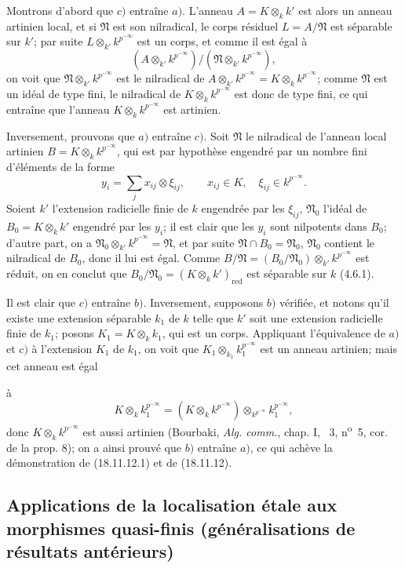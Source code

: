 Montrons d'abord que $c)$ entraîne $a)$. L'anneau $A=K\otimes_k k'$ est alors un anneau artinien local, et si $\mathfrak N$ est son nilradical, le corps résiduel $L=A/\mathfrak N$ est séparable sur $k'$; par suite $L\otimes_{k'}k^{p^{-\infty}}$ est un corps, et comme il est égal à
\[
  (A\otimes_{k'}k^{p^{-\infty}})/(\mathfrak N\otimes_{k'}k^{p^{-\infty}}),
\]
on voit que $\mathfrak N\otimes_{k'}k^{p^{-\infty}}$ est le nilradical de $A\otimes_{k'}k^{p^{-\infty}}=K\otimes_k k^{p^{-\infty}}$; comme $\mathfrak N$ est un idéal de type fini, le nilradical de $K\otimes_k k^{p^{-\infty}}$ est donc de type fini, ce qui entraîne que l'anneau $K\otimes_k k^{p^{-\infty}}$ est artinien.

Inversement, prouvons que $a)$ entraîne $c)$. Soit $\mathfrak N$ le nilradical de l'anneau local artinien $B=K\otimes_k k^{p^{-\infty}}$, qui est par hypothèse engendré par un nombre fini d'éléments de la forme
\[
  y_i=\sum_j x_{ij}\otimes\xi_{ij},\qquad x_{ij}\in K,\quad \xi_{ij}\in k^{p^{-\infty}}.
\]
Soient $k'$ l'extension radicielle finie de $k$ engendrée par les $\xi_{ij}$, $\mathfrak N_0$ l'idéal de $B_0=K\otimes_k k'$ engendré par les $y_i$; il est clair que les $y_i$ sont nilpotents dans $B_0$; d'autre part, on a $\mathfrak N_0\otimes_{k'}k^{p^{-\infty}}=\mathfrak N$, et par suite $\mathfrak N\cap B_0=\mathfrak N_0$, $\mathfrak N_0$ contient le nilradical de $B_0$, donc il lui est égal. Comme $B/\mathfrak N=(B_0/\mathfrak N_0)\otimes_{k'}k^{p^{-\infty}}$ est réduit, on en conclut que $B_0/\mathfrak N_0=(K\otimes_k k')_{\mathrm{red}}$ est séparable sur $k$ (4.6.1).

Il est clair que $c)$ entraîne $b)$. Inversement, supposons $b)$ vérifiée, et notons qu'il existe une extension séparable $k_1$ de $k$ telle que $k'$ soit une extension radicielle finie de $k_1$; posons $K_1=K\otimes_k k_1$, qui est un corps. Appliquant l'équivalence de $a)$ et $c)$ à l'extension $K_1$ de $k_1$, on voit que $K_1\otimes_{k_1}k_1^{p^{-\infty}}$ est un anneau artinien; mais cet anneau est égal


à
\[
  K\otimes_k k_1^{p^{-\infty}}=(K\otimes_k k^{p^{-\infty}})\otimes_{k^{p^{-\infty}}}k_1^{p^{-\infty}},
\]
donc $K\otimes_k k^{p^{-\infty}}$ est aussi artinien (Bourbaki, \emph{Alg. comm.}, chap. I, \textsection~3, n\textsuperscript{o}~5, cor. de la prop. 8); on a ainsi prouvé que $b)$ entraîne $a)$, ce qui achève la démonstration de (18.11.12.1) et de (18.11.12).

\subsection{Applications de la localisation étale aux morphismes quasi-finis (généralisations de résultats antérieurs)}

